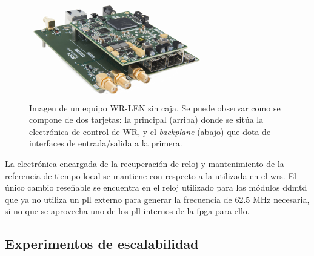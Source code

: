 \begin{figure}
	\centering
	\includegraphics[width=0.7\linewidth]{imagenes/wrlen}
	\caption[WR-LEN en su versión para desarrolladores]{Imagen de un equipo 
	WR-LEN sin caja. Se puede observar como se compone de dos tarjetas: la 
	principal (arriba) donde se sitúa la electrónica de control de WR, y el 
	\textit{backplane} (abajo) que dota de interfaces de entrada/salida a la 
	primera.}
	\label{fig:wrlen}
\end{figure}


La electrónica encargada de la recuperación de reloj y mantenimiento de la 
referencia de tiempo local se mantiene con respecto a la utilizada en el 
\gls{wrs}.  El 
único cambio reseñable se encuentra en el reloj utilizado para los módulos 
\gls{ddmtd} que ya no utiliza un \gls{pll} externo para generar la frecuencia 
de 62.5 MHz necesaria, si no que se aprovecha uno de los \gls{pll} internos de 
la \gls{fpga} para ello. 


\subsection{Experimentos de escalabilidad}

